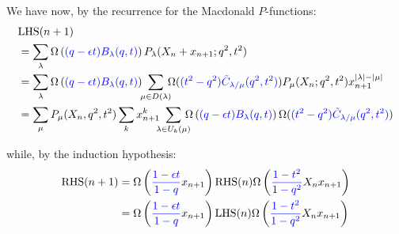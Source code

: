 \documentclass[12pt,dvips]{amsart}
\begin{document}
\medskip
\noindent
We have now, by the recurrence for the Macdonald $P$-functions:
\begin{align*}
&\text{LHS}(n+1) 
\\&= \sum_{ \lambda} \Omega \left ( {\color{blue}(q - \epsilon t) B_\lambda(q,t)}\right ) P_\lambda(X_n + x_{n+1};q^2,t^2) \\
&= \sum_{ \lambda} \Omega \left ( {\color{blue}(q - \epsilon t) B_\lambda(q,t)}\right ) \!\!\sum_{\mu \in D(\lambda) }\!\!\!\Omega({\color{blue}(t^2 - q^2) \tilde{C}_{\lambda / \mu}(q^2,t^2)}) P_\mu(X_n;q^2, t^2) x_{n+1}^{|\lambda| - |\mu|} \\
&= \sum_\mu P_\mu(X_n,q^2,t^2) \sum_k x_{n+1}^k\!\!\! \sum_{\lambda \in U_k(\mu)}\!\!\!\! \Omega \left ( {\color{blue}(q - \epsilon t) B_\lambda(q,t)}\right ) \Omega({\color{blue}(t^2 - q^2) \tilde{C}_{\lambda / \mu}(q^2,t^2)})
\end{align*}

\medskip
\noindent
while, by the induction hypothesis:
\begin{align*}
\text{RHS}(n+1) &= \Omega \left ( {\color{blue}\frac{1-\epsilon t}{1-q}} x_{n+1}\right ) \text{RHS}(n)  \Omega \left ({\color{blue}\frac{1-t^2}{1-q^2}} X_n x_{n+1} \right ) \\
&= \Omega \left ( {\color{blue}\frac{1-\epsilon t}{1-q}} x_{n+1}\right ) \text{LHS}(n) \Omega \left ({\color{blue}\frac{1-t^2}{1-q^2}} X_n x_{n+1} \right )  \end{align*}
\end{document}
